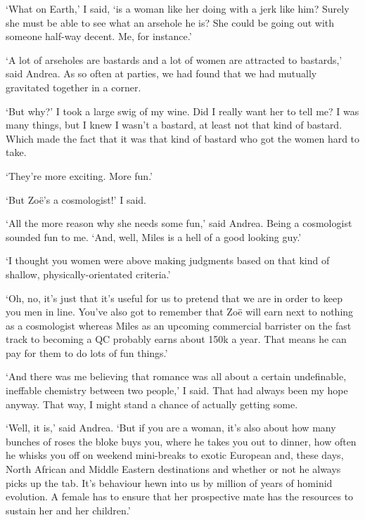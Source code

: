 
\twelverm
`What on Earth,' I said, `is a woman like her doing with a
jerk like him? Surely she must be able to see what an arsehole he
is? She could be going out with someone half-way decent. Me, for
instance.'

`A lot of arseholes are bastards and a lot of women are attracted to
bastards,' said Andrea. As so often at parties, we
had found that we had mutually gravitated together in a corner.

`But why?' I took a large swig of my wine. Did I really want her to
tell me? I was many things, but I knew I wasn't a bastard, at least not that kind of bastard. Which
made the fact that it was that kind of bastard who got the women hard to
take.

`They're more exciting. More fun.'

`But Zoë's a cosmologist!' I said.

`All the more reason why she needs some fun,' said Andrea. Being a cosmologist
sounded fun to me. `And, well, Miles is a hell of a good looking
guy.'

`I thought you women were above making judgments based on that kind of shallow, physically-orientated criteria.'

`Oh, no, it's just that it's useful for us to pretend
that we are in order to keep you men in line. You've also got to
remember that Zoë will earn next to nothing as a cosmologist whereas Miles as an
upcoming commercial barrister on the fast track to becoming a QC probably earns about 150k a year.
That means he can pay for them to do lots of fun things.'

`And there was me believing that romance was all about a certain undefinable, ineffable
chemistry between two people,' I said. That had always been my hope anyway.
That way, I might stand a chance of actually getting some.

`Well, it is,' said Andrea. `But if you are a woman, it's also about how many
bunches of roses the bloke buys you, where he takes you out to dinner,
how often he whisks you off on weekend mini-breaks to exotic
European and, these days, North African and Middle Eastern destinations and whether or not he {\twelveit always\/}
picks up the tab.
It's behaviour hewn into us by million of years of hominid
evolution. A female has to ensure that her prospective mate has the resources
to sustain her and her children.'


